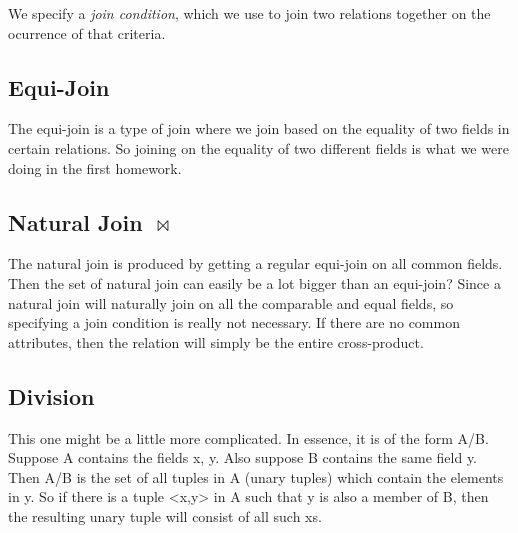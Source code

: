 \documentclass{article}
\begin{document}
We specify a \textit{join condition}, which we use to join two relations together on the ocurrence of that criteria.
\subsection{Equi-Join}
The equi-join is a type of join where we join based on the equality of two fields in certain relations. So joining on the
equality of two different fields is what we were doing in the first homework.
\subsection{Natural Join $\bowtie$}
The natural join is produced by getting a regular equi-join on all common fields. Then the set of natural join can
easily be a lot bigger than an equi-join? Since a natural join will naturally join on all the comparable and equal fields, 
so specifying a join condition is really not necessary. If there are no common attributes, then the relation will simply 
be the entire cross-product.
\subsection{Division}
This one might be a little more complicated. In essence, it is of the form A/B. Suppose A contains the fields x, y. 
Also suppose B contains the same field y. Then A/B is the set of all tuples in A (unary tuples) which contain the 
elements in y. So if there is a tuple <x,y> in A such that y is also a member of B, then the resulting unary tuple
will consist of all such xs.
\end{document}
